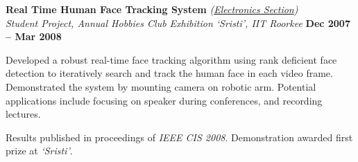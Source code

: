 \documentclass[margin,line]{resume}
\begin{document}
\begin{resume}
    \textbf{Real Time Human Face Tracking System}
    \emph{(\href{http://www.iitr.ac.in/campus_life/pages/Clubs+Hobbies_Club+Electronics.html}
    {Electronics Section})}  								\\
    \emph{Student Project, Annual Hobbies Club Exhibition
    `Sristi', IIT Roorkee} 				\hfill \textbf{Dec 2007 -- Mar 2008} 	\\\vspace{-4mm}
    \begin{list2}
    \item Developed a robust real-time face tracking algorithm using rank deficient face detection
    to iteratively search and track the human face in each video frame. 
    Demonstrated the system by mounting camera on robotic arm.
    Potential applications include focusing on speaker
    during conferences, and recording lectures.
    \item Results published in proceedings of \emph{IEEE CIS 2008}. Demonstration awarded first prize at \emph{`Sristi'}.
    \end{list2}
%


\end{resume}
\end{document}
